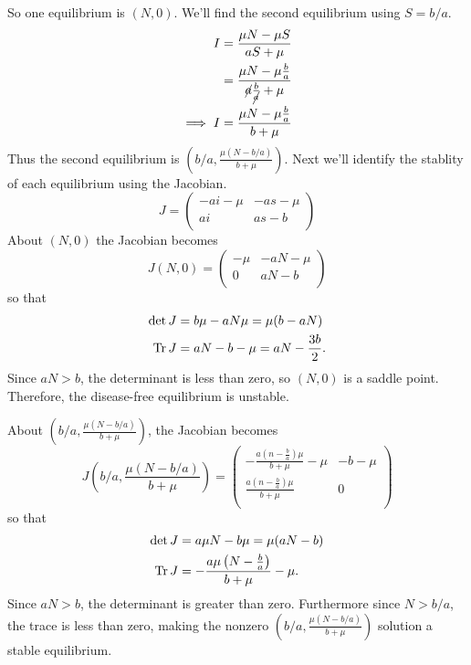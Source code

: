 \documentclass[12pt]{article}
\begin{document}
So one equilibrium is $(N,0)$. We'll find the second equilibrium using $S=b/a$.
\begin{equation*}
  \begin{aligned}
    I &= \frac{\mu N - \mu S}{aS+\mu} \\
    &= \frac{\mu N - \mu \frac{b}{a}}{\cancel{a}\frac{b}{\cancel{a}}+\mu} \\
    \implies I &= \frac{\mu N - \mu \frac{b}{a}}{b+\mu} \\
  \end{aligned}
\end{equation*}
Thus the second equilibrium is $\left(b/a,\frac{\mu(N-b/a)}{b+\mu}\right)$. Next
we'll identify the stablity of each equilibrium using the Jacobian.
\begin{equation*}
  J =
  \begin{pmatrix}
    -a i-\mu  & -a s-\mu  \\
    a i & a s-b \\
  \end{pmatrix}
\end{equation*}
About $(N,0)$ the Jacobian becomes
\begin{equation*}
  J(N,0) =
  \begin{pmatrix}
    -\mu  & -a N-\mu  \\
    0 & a N-b \\
  \end{pmatrix}
\end{equation*}
so that
\begin{equation*}
  \begin{aligned}
    \det{J} &= b \mu - a N \mu = \mu(b-aN)\\
    \operatorname{Tr}{J} &= a N - b - \mu = aN-\frac{3b}{2}. \\
  \end{aligned}
\end{equation*}
Since $aN>b$, the determinant is less than zero, so $(N,0)$ is a saddle point.
Therefore, the disease-free equilibrium is unstable.

About $\left(b/a,\frac{\mu(N-b/a)}{b+\mu}\right)$, the Jacobian becomes
\begin{equation*}
  J\left(b/a,\frac{\mu(N-b/a)}{b+\mu}\right) =
  \begin{pmatrix}
    -\frac{a \left(n-\frac{b}{a}\right) \mu }{b+\mu }-\mu  & -b-\mu  \\
    \frac{a \left(n-\frac{b}{a}\right) \mu }{b+\mu } & 0 \\
  \end{pmatrix}
\end{equation*}
so that
\begin{equation*}
  \begin{aligned}
    \det{J} &= a \mu  N-b \mu = \mu(aN-b)\\
    \operatorname{Tr}{J} &= -\frac{a \mu  \left(N-\frac{b}{a}\right)}{b+\mu}-\mu. \\
  \end{aligned}
\end{equation*}
Since $aN>b$, the determinant is greater than zero. Furthermore since $N>b/a$,
the trace is less than zero, making the nonzero
$\left(b/a,\frac{\mu(N-b/a)}{b+\mu}\right)$ solution a stable equilibrium.
\end{document}
